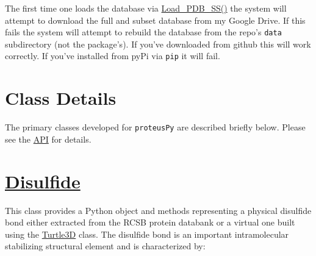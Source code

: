 The first time one loads the database via
\href{https://suchanek.github.io/proteusPy/proteusPy/DisulfideLoader.html\#Load_PDB_SS}{Load\_PDB\_SS()}
the system will attempt to download the full and subset database from my
Google Drive. If this fails the system will attempt to rebuild the
database from the repo's \texttt{data} subdirectory (not the package's).
If you've downloaded from github this will work correctly. If you've
installed from pyPi via \texttt{pip} it will fail.

\hypertarget{class-details}{%
\section{Class Details}\label{class-details}}

The primary classes developed for \texttt{proteusPy} are described
briefly below. Please see the
\href{https://suchanek.github.io/proteusPy/proteusPy.html}{API} for
details.

\hypertarget{disulfide}{%
\section{\texorpdfstring{\href{https://suchanek.github.io/proteusPy/proteusPy/Disulfide.html}{Disulfide}}{Disulfide}}\label{disulfide}}

This class provides a Python object and methods representing a physical
disulfide bond either extracted from the RCSB protein databank or a
virtual one built using the
\href{https://suchanek.github.io/proteusPy/proteusPy/turtle3D.html}{Turtle3D}
class. The disulfide bond is an important intramolecular stabilizing
structural element and is characterized by:


